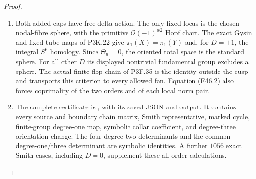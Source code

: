 \begin{proof}
\begin{enumerate}[label=\arabic*.]
\item Both added caps have free delta action. The only fixed locus
is the chosen nodal-fibre sphere, with the primitive
$\mathcal O(-1)^{\oplus2}$ Hopf chart. The exact Gysin and
fixed-tube maps of P3K.22 give $\pi_1(X)=\pi_1(Y)$ and, for
$D=\pm1$, the integral $S^6$ homology. Since $\Theta_6=0$,
the oriented total space is the standard sphere. For all other
$D$ its displayed nontrivial fundamental group excludes a
sphere. The actual finite flop chain of P3F.35 is the identity
outside the cusp and transports this criterion to every allowed
fan. Equation (F46.2) also forces coprimality of the two orders
and of each local norm pair.

\item The complete certificate is
, with its saved JSON and
output. It contains every source and boundary chain matrix,
Smith representative, marked cycle, finite-group degree-one
map, symbolic collar coefficient, and degree-three orientation
change. The four degree-two determinants and the common
degree-one/three determinant are symbolic identities. A further
$1056$ exact Smith cases, including $D=0$, supplement these
all-order calculations.

\end{enumerate}
\end{proof}